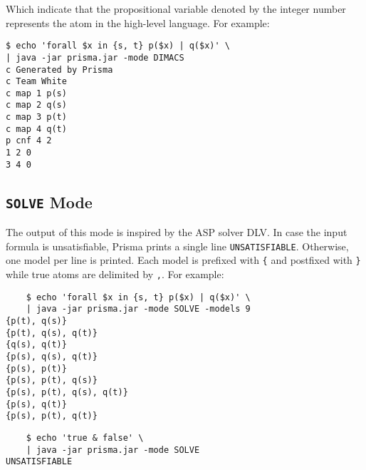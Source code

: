 \documentclass{llncs}
\begin{document}
\begin{enumerate}
Which indicate that the propositional variable denoted by the integer number represents the atom in the high-level language. For example:

\begin{verbatim}
$ echo 'forall $x in {s, t} p($x) | q($x)' \
| java -jar prisma.jar -mode DIMACS    
c Generated by Prisma
c Team White
c map 1 p(s)
c map 2 q(s)
c map 3 p(t)
c map 4 q(t)
p cnf 4 2
1 2 0
3 4 0

\end{verbatim}

\subsection{\texttt{SOLVE} Mode}

The output of this mode is inspired by the ASP solver DLV. In case the input formula is unsatisfiable, Prisma prints a single line \texttt{UNSATISFIABLE}. Otherwise, one model per line is printed. Each model is prefixed with \texttt{\{} and postfixed with \texttt{\}} while true atoms are delimited by \texttt{,}. For example:

\begin{verbatim}
	$ echo 'forall $x in {s, t} p($x) | q($x)' \
	| java -jar prisma.jar -mode SOLVE -models 9
{p(t), q(s)}
{p(t), q(s), q(t)}
{q(s), q(t)}
{p(s), q(s), q(t)}
{p(s), p(t)}
{p(s), p(t), q(s)}
{p(s), p(t), q(s), q(t)}
{p(s), q(t)}
{p(s), p(t), q(t)}
\end{verbatim}

\begin{verbatim}
	$ echo 'true & false' \
	| java -jar prisma.jar -mode SOLVE
UNSATISFIABLE
\end{verbatim}

\end{enumerate}
\end{document}
